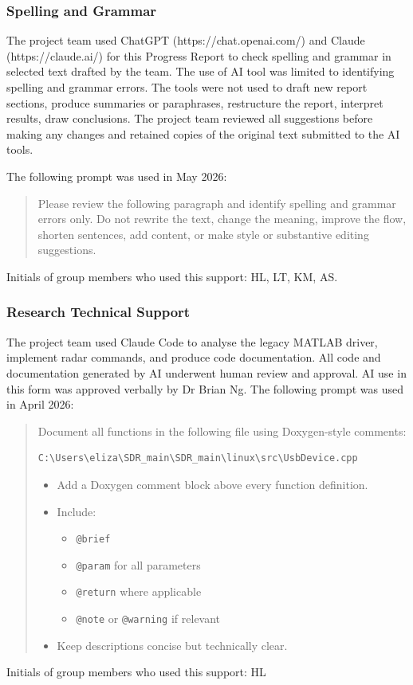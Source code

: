 \documentclass[11pt,a4paper]{report}
\newif\ifPrismAppendices
\begin{document}
\subsubsection*{Spelling and Grammar}
The project team used ChatGPT (https://chat.openai.com/) and Claude (https://claude.ai/) for this Progress Report to check spelling and grammar in selected text drafted by the team. The use of AI tool was limited to identifying spelling and grammar errors. The tools were not used to draft new report sections, produce summaries or paraphrases, restructure the report, interpret results, draw conclusions. The project team reviewed all suggestions before making any changes and retained copies of the original text submitted to the AI tools.

The following prompt was used in May 2026:

\begin{quote}
Please review the following paragraph and identify spelling and grammar errors only. Do not rewrite the text, change the meaning, improve the flow, shorten sentences, add content, or make style or substantive editing suggestions.
\end{quote}

Initials of group members who used this support: HL, LT, KM, AS.

\subsubsection*{Research Technical Support}

The project team used Claude Code to analyse the legacy MATLAB driver, implement radar commands, and produce code documentation. All code and documentation generated by AI underwent human review and approval. AI use in this form was approved verbally by Dr Brian Ng. The following prompt was used in April 2026:

\begin{quote}
Document all functions in the following file using Doxygen-style comments:

\begin{verbatim}
C:\Users\eliza\SDR_main\SDR_main\linux\src\UsbDevice.cpp
\end{verbatim}

\begin{itemize}
    \item Add a Doxygen comment block above every function definition.
    \item Include:
    \begin{itemize}
        \item \texttt{@brief}
        \item \texttt{@param} for all parameters
        \item \texttt{@return} where applicable
        \item \texttt{@note} or \texttt{@warning} if relevant
    \end{itemize}
    \item Keep descriptions concise but technically clear.
\end{itemize}
\end{quote}

Initials of group members who used this support: HL
\fi



\ifPrismAppendices
\clearpage
\appendix

\fi
\end{document}
